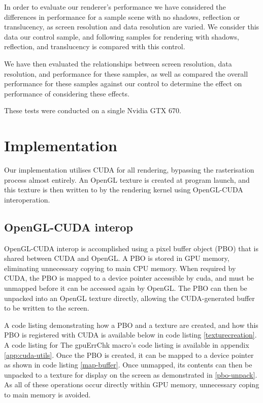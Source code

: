 In order to evaluate our renderer's performance we have considered the differences in performance for a sample scene with no shadows, reflection or translucency, as screen resolution and data resolution are varied. We consider this data our control sample, and following samples for rendering with shadows, reflection, and translucency is compared with this control.

We have then evaluated the relationships between screen resolution, data resolution, and performance for these samples, as well as compared the overall performance for these samples against our control to determine the effect on performance of considering these effects.

These tests were conducted on a single Nvidia GTX 670.

\section{Implementation}
Our implementation utilises CUDA for all rendering, bypassing the rasterisation process almost entirely. An OpenGL texture is created at program launch, and this texture is then written to by the rendering kernel using OpenGL-CUDA interoperation.

\subsection{OpenGL-CUDA interop}
OpenGL-CUDA interop is accomplished using a pixel buffer object (PBO) that is shared between CUDA and OpenGL. A PBO is stored in GPU memory, eliminating unnecessary copying to main CPU memory. When required by CUDA, the PBO is mapped to a device pointer accessible by cuda, and must be unmapped before it can be accessed again by OpenGL. The PBO can then be unpacked into an OpenGL texture directly, allowing the CUDA-generated buffer to be written to the screen.

A code listing demonstrating how a PBO and a texture are created, and how this PBO is registered with CUDA is available below in code listing \ref{texturecreation}. A code listing for The gpuErrChk macro's code listing is available in appendix \ref{app:cuda-utils}. Once the PBO is created, it can be mapped to a device pointer as shown in code listing \ref{map-buffer}. Once unmapped, its contents can then be unpacked to a texture for display on the screen as demonstrated in \ref{pbo-unpack}. As all of these operations occur directly within GPU memory, unnecessary coping to main memory is avoided.

